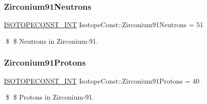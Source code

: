 \subsubsection{\texorpdfstring{Zirconium91\+Neutrons}{Zirconium91Neutrons}}
{\footnotesize\ttfamily \mbox{\hyperlink{group___isotope_const-_macros_ga5f18360b3e99483a35c32d789e62621c}{I\+S\+O\+T\+O\+P\+E\+C\+O\+N\+S\+T\+\_\+\+I\+NT}} Isotope\+Const\+::\+Zirconium91\+Neutrons = 51}

\$ \$ Neutrons in Zirconium-\/91. \mbox{\label{group___isotope_const-_zirconium-_zr91_ga418971594a587da2d0e749cd09c25f07}} 
\subsubsection{\texorpdfstring{Zirconium91\+Protons}{Zirconium91Protons}}
{\footnotesize\ttfamily \mbox{\hyperlink{group___isotope_const-_macros_ga5f18360b3e99483a35c32d789e62621c}{I\+S\+O\+T\+O\+P\+E\+C\+O\+N\+S\+T\+\_\+\+I\+NT}} Isotope\+Const\+::\+Zirconium91\+Protons = 40}

\$ \$ Protons in Zirconium-\/91. 